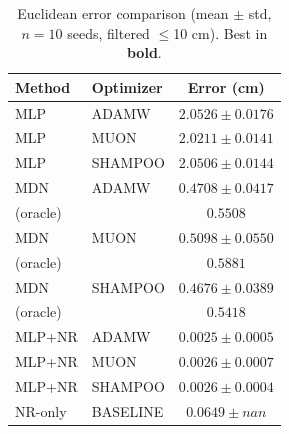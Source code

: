 \begin{table}[H]
\centering
\caption{Euclidean error comparison (mean $\pm$ std, $n=10$ seeds, filtered $\leq$10 cm). Best in \textbf{bold}.}
\label{tab:euclid}
\begin{tabular}{llc}
\toprule
Method & Optimizer & Error (cm) \\
\midrule
MLP & ADAMW & $2.0526 \pm 0.0176$ \\
MLP & MUON & $2.0211 \pm 0.0141$ \\
MLP & SHAMPOO & $2.0506 \pm 0.0144$ \\
\midrule
MDN & ADAMW & $0.4708 \pm 0.0417$ \\
\quad (oracle) & & $0.5508$ \\
MDN & MUON & $0.5098 \pm 0.0550$ \\
\quad (oracle) & & $0.5881$ \\
MDN & SHAMPOO & $0.4676 \pm 0.0389$ \\
\quad (oracle) & & $0.5418$ \\
\midrule
MLP+NR & ADAMW & \textbf{$0.0025 \pm 0.0005$} \\
MLP+NR & MUON & \textbf{$0.0026 \pm 0.0007$} \\
MLP+NR & SHAMPOO & \textbf{$0.0026 \pm 0.0004$} \\
\midrule
NR-only & BASELINE & $0.0649 \pm nan$ \\
\bottomrule
\end{tabular}
\end{table}